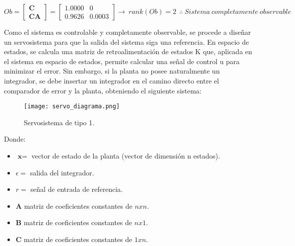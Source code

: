 \vspace{-0.5cm}
\begin{equation}
    Ob
    =
    \begin{bmatrix}
        \textbf{C}  \\ \textbf{CA}
    \end{bmatrix}
    =
    \begin{bmatrix}
        1.0000  &    0      \\ 
        0.9626  &    0.0003
    \end{bmatrix}
    \rightarrow
    \
    rank(Ob) = 2\            
    \
    \therefore
    \ Sistema\  completamente \ observable
\end{equation}
\vspace{-0.5cm}         

Como el sistema es controlable y completamente observable, se procede a diseñar un servosistema para que la
salida del sistema siga una referencia. En espacio de estados, se calcula una matriz de retroalimentación de estados
K que, aplicada en el sistema en espacio de estados, permite calcular una señal de control u para minimizar el error.
Sin embargo, si la planta no posee naturalmente un integrador, se debe insertar un integrador
en el camino directo entre el comparador de error y la planta, obteniendo el siguiente sistema:

\begin{figure}[H]
    \centering
    \texttt{[image: servo\_diagrama.png]}
    \vspace{-0.25cm}
    \caption{Servosistema de tipo 1.}
    \label{fig:servo_diagrama}
\end{figure}

Donde:

\begin{itemize}[noitemsep]
    \item $\textbf{x} =$ vector de estado de la planta (vector de dimensión n estados).
    \item $\epsilon =$ salida del integrador.
    \item $r =$ señal de entrada de referencia.
    \item $\textbf{A}$ matriz de coeficientes constantes de $n x n$.
    \item $\textbf{B}$ matriz de coeficientes constantes de $n x 1$.
    \item $\textbf{C}$ matriz de coeficientes constantes de $1 x n$.
\end{itemize}

\parencite{OGATA}

